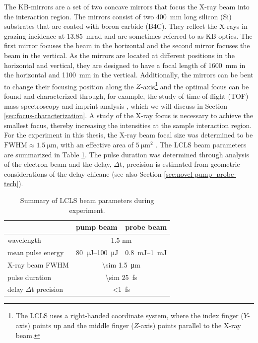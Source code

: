 The KB-mirrors are a set of two concave mirrors that focus the X-ray beam into the interaction region. The mirrors consist of two \SI{400}{\milli\meter} long silicon (Si) substrates that are coated with boron carbide (B4C). They reflect the X-rays in grazing incidence at \SI{13.85}{\milli\radian} and are sometimes referred to as KB-optics. The first mirror focuses the beam in the horizontal and the second mirror focuses the beam in the vertical. As the mirrors are located at different positions in the horizontal and vertical, they are designed to have a focal length of \SI{1600}{\milli\meter} in the horizontal and \SI{1100}{\milli\meter} in the vertical. Additionally, the mirrors can be bent to change their focusing position along the $Z$-axis\footnote{The LCLS uses a right-handed coordinate system, where the index finger ($Y$-axis) points up and the middle finger ($Z$-axis) points parallel to the X-ray beam.} and the optimal focus can be found and characterized through, for example, the study of time-of-flight (TOF) mass-spectroscopy \citep{Bucher-2016-Unpublished} and imprint analysis \citep{Hajkova-2011-SPIE,Chalupsky-2011-NIMPR}, which we will discuss in Section \ref{sec:focus-characterization}. A study of the X-ray focus is necessary to achieve the smallest focus, thereby increasing the intensities at the sample interaction region.
%
%
%
%
For the experiment in this thesis, the X-ray beam focal size was determined to be $\text{FWHM}\approx \SI{1.5}{\micro\meter}$, with an effective area of $\SI{5}{\micro\meter\squared}$ \citep{Bucher-2016-Unpublished}. The LCLS beam parameters are summarized in Table \ref{tab:beam-params}. The pulse duration was determined through analysis of the electron beam and the delay, $\Delta$t, precision is estimated from geometric considerations of the delay chicane (see also Section \ref{sec:novel-pump--probe-tech}).
\begin{table}
	\centering
		\begin{tabular}{ | l | l | l | }
		\hline
			 & pump beam & probe beam  \\ \hline
			wavelength & \multicolumn{2}{|c|}{1.5 nm} \\ \hline
			mean pulse energy & \SIrange{80}{100}{\micro\joule} & \SIrange{0.8}{1}{\milli\joule} \\ \hline
			X-ray beam FWHM & \multicolumn{2}{|c|}{\SI{\sim 1.5}{\micro\meter}} \\ \hline
			pulse duration & \multicolumn{2}{|c|}{\SI{\sim 25}{\femto\second}} \\ \hline
			delay $\Delta$t precision & \multicolumn{2}{|c|}{\SI{<1}{\femto\second}} \\ \hline
		\end{tabular}
	\caption{Summary of LCLS beam parameters during experiment.}
	\label{tab:beam-params}
\end{table}
%
%
%
